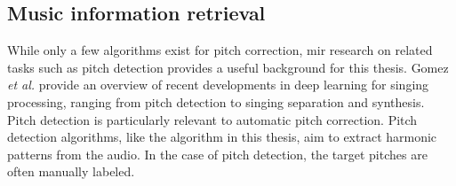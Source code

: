 \subsection{Music information retrieval}
While only a few algorithms exist for pitch correction, \gls{mir} research on related tasks such as pitch detection provides a useful background for this thesis. Gomez {\it et al.} \cite{gomez2018deep} provide an overview of recent developments in deep learning for singing processing, ranging from pitch detection to singing separation and synthesis. Pitch detection is particularly relevant to automatic pitch correction. Pitch detection algorithms, like the algorithm in this thesis, aim to extract harmonic patterns from the audio. In the case of pitch detection, the target pitches are often manually labeled. 

